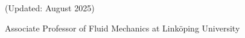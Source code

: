 \documentclass[a4paper,11pt]{article}
\begin{document}
\begin{flushright}
(Updated: August 2025)
\end{flushright}
{\centering {}\par}
\begin{center}
{\large Associate Professor of Fluid Mechanics at Linköping University}
\end{center}





% 






% 
% 


% 
\end{document}
